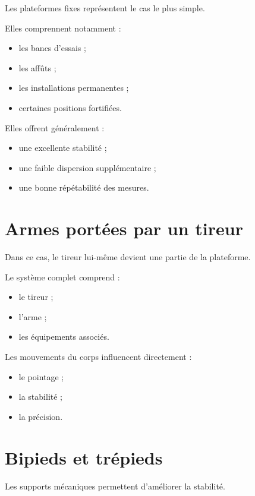 Les plateformes fixes représentent le cas le plus simple.

Elles comprennent notamment :

\begin{itemize}
    \item les bancs d'essais ;
    \item les affûts ;
    \item les installations permanentes ;
    \item certaines positions fortifiées.
\end{itemize}

Elles offrent généralement :

\begin{itemize}
    \item une excellente stabilité ;
    \item une faible dispersion supplémentaire ;
    \item une bonne répétabilité des mesures.
\end{itemize}

\section{Armes portées par un tireur}

Dans ce cas, le tireur lui-même devient une partie de la plateforme.

Le système complet comprend :

\begin{itemize}
    \item le tireur ;
    \item l'arme ;
    \item les équipements associés.
\end{itemize}

Les mouvements du corps influencent directement :

\begin{itemize}
    \item le pointage ;
    \item la stabilité ;
    \item la précision.
\end{itemize}

\section{Bipieds et trépieds}

Les supports mécaniques permettent d'améliorer la stabilité.

